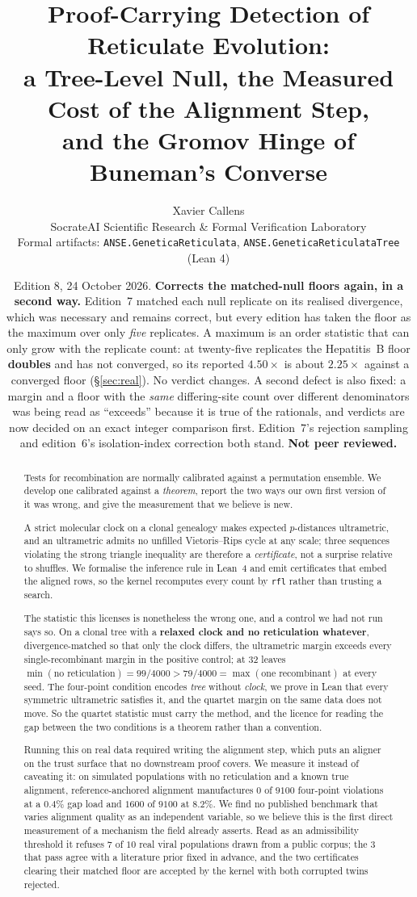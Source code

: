 \documentclass[11pt,a4paper]{article}
\title{\textbf{Proof-Carrying Detection of Reticulate Evolution:\\
a Tree-Level Null, the Measured Cost of the Alignment Step,\\
and the Gromov Hinge of Buneman's Converse}}
\author{Xavier Callens\\
\small SocrateAI Scientific Research \& Formal Verification Laboratory\\
\small Formal artifacts: \texttt{ANSE.GeneticaReticulata},
\texttt{ANSE.GeneticaReticulataTree} (Lean 4)}
\date{Edition 8, 24 October 2026. \textbf{Corrects the matched-null floors
again, in a second way.} Edition~7 matched each null replicate on its realised
divergence, which was necessary and remains correct, but every edition has taken
the floor as the maximum over only \emph{five} replicates. A maximum is an order
statistic that can only grow with the replicate count: at twenty-five replicates
the Hepatitis~B floor \textbf{doubles} and has not converged, so its reported
$4.50\times$ is about $2.25\times$ against a converged floor
(\S\ref{sec:real}). No verdict changes. A second defect is also fixed: a margin
and a floor with the \emph{same} differing-site count over different
denominators was being read as ``exceeds'' because it is true of the rationals,
and verdicts are now decided on an exact integer comparison first. Edition~7's
rejection sampling and edition~6's isolation-index correction both stand.
\textbf{Not peer reviewed.}}
\theoremstyle{definition}
\theoremstyle{remark}
\begin{document}
\maketitle

\begin{abstract}
\noindent
Tests for recombination are normally calibrated against a permutation ensemble.
We develop one calibrated against a \emph{theorem}, report the two ways our own
first version of it was wrong, and give the measurement that we believe is new.

A strict molecular clock on a clonal genealogy makes expected $p$-distances
ultrametric, and an ultrametric admits no unfilled Vietoris--Rips cycle at any
scale; three sequences violating the strong triangle inequality are therefore a
\emph{certificate}, not a surprise relative to shuffles. We formalise the
inference rule in Lean~4 and emit certificates that embed the aligned rows, so
the kernel recomputes every count by \texttt{rfl} rather than trusting a search.

The statistic this licenses is nonetheless the wrong one, and a control we had
not run says so. On a clonal tree with a \textbf{relaxed clock and no
reticulation whatever}, divergence-matched so that only the clock differs, the
ultrametric margin exceeds every single-recombinant margin in the positive
control; at 32 leaves $\min(\text{no reticulation}) = 99/4000 > 79/4000 =
\max(\text{one recombinant})$ at every seed. The four-point condition encodes
\emph{tree} without \emph{clock}, we prove in Lean that every symmetric
ultrametric satisfies it, and the quartet margin on the same data does not move.
So the quartet statistic must carry the method, and the licence for reading the
gap between the two conditions is a theorem rather than a convention.

Running this on real data required writing the alignment step, which puts an
aligner on the trust surface that no downstream proof covers. We measure it
instead of caveating it: on simulated populations with no reticulation and a
known true alignment, reference-anchored alignment manufactures $0$ of $9100$
four-point violations at a $0.4\%$ gap load and $1600$ of $9100$ at $8.2\%$. We
find no published benchmark that varies alignment quality as an independent
variable, so we believe this is the first direct measurement of a mechanism the
field already asserts. Read as an admissibility threshold it refuses $7$ of $10$
real viral populations drawn from a public corpus; the $3$ that pass agree with a
literature prior fixed in advance, and the two certificates clearing their matched
floor are accepted by the kernel with both corrupted twins rejected.


\end{abstract}
\end{document}
